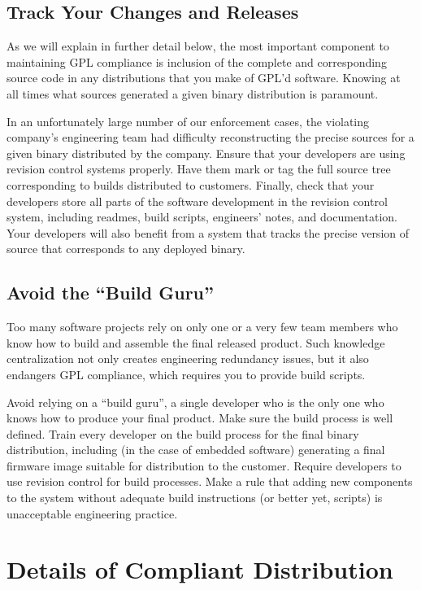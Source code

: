 \documentclass[letterpaper]{fixme}
\begin{document}
\subsection{Track Your Changes and Releases}

As we will explain in further detail below, the most important component
to maintaining GPL compliance is inclusion of the complete and
corresponding source code in any distributions that you make of GPL'd
software.  Knowing at all times what sources generated a given binary
distribution is paramount.

In an unfortunately large number of our enforcement cases, the violating
company's engineering team had difficulty reconstructing the precise
sources for a given binary distributed by the company.  Ensure that your
developers are using revision control systems properly.  Have them mark or
tag the full source tree corresponding to builds distributed to customers.
Finally, check that your developers store all parts of the software
development in the revision control system, including {\sc readme}s, build
scripts, engineers' notes, and documentation.  Your developers will also
benefit from a system that tracks the precise version of source that
corresponds to any deployed binary.

\subsection{Avoid the ``Build Guru''}

Too many software projects rely on only one or a very few team members who
know how to build and assemble the final released product.  Such knowledge
centralization not only creates engineering redundancy issues, but it also
endangers GPL compliance, which requires you to provide build scripts.

Avoid relying on a ``build guru'', a single developer who is the only one
who knows how to produce your final product. Make sure the build process
is well defined.  Train every developer on the build process for the final
binary distribution, including (in the case of embedded software)
generating a final firmware image suitable for distribution to the
customer.  Require developers to use revision control for build processes.
Make a rule that adding new components to the system without adequate
build instructions (or better yet, scripts) is unacceptable engineering
practice.

\section{Details of Compliant Distribution}
\end{document}
